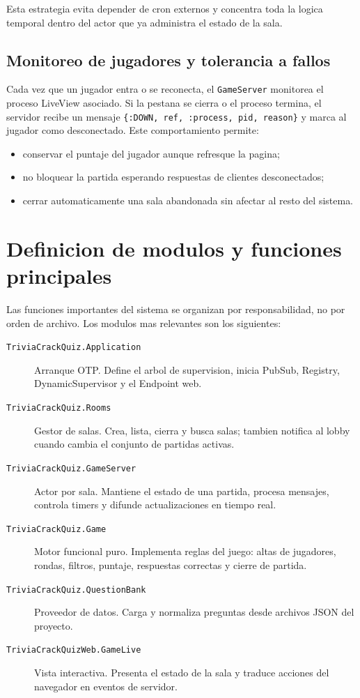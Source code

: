 \documentclass[12pt,a4paper]{article}
\begin{document}
Esta estrategia evita depender de cron externos y concentra toda la logica
temporal dentro del actor que ya administra el estado de la sala.

\subsection{Monitoreo de jugadores y tolerancia a fallos}

Cada vez que un jugador entra o se reconecta, el \texttt{GameServer} monitorea
el proceso LiveView asociado. Si la pestana se cierra o el proceso termina, el
servidor recibe un mensaje \texttt{\{:DOWN, ref, :process, pid, reason\}} y
marca al jugador como desconectado. Este comportamiento permite:

\begin{itemize}
  \item conservar el puntaje del jugador aunque refresque la pagina;
  \item no bloquear la partida esperando respuestas de clientes desconectados;
  \item cerrar automaticamente una sala abandonada sin afectar al resto del
  sistema.
\end{itemize}

\section{Definicion de modulos y funciones principales}

Las funciones importantes del sistema se organizan por responsabilidad, no por
orden de archivo. Los modulos mas relevantes son los siguientes:

\begin{description}
  \item[\texttt{TriviaCrackQuiz.Application}] Arranque OTP. Define el arbol de
  supervision, inicia PubSub, Registry, DynamicSupervisor y el Endpoint web.
  \item[\texttt{TriviaCrackQuiz.Rooms}] Gestor de salas. Crea, lista, cierra y
  busca salas; tambien notifica al lobby cuando cambia el conjunto de partidas
  activas.
  \item[\texttt{TriviaCrackQuiz.GameServer}] Actor por sala. Mantiene el estado
  de una partida, procesa mensajes, controla timers y difunde actualizaciones
  en tiempo real.
  \item[\texttt{TriviaCrackQuiz.Game}] Motor funcional puro. Implementa reglas
  del juego: altas de jugadores, rondas, filtros, puntaje, respuestas
  correctas y cierre de partida.
  \item[\texttt{TriviaCrackQuiz.QuestionBank}] Proveedor de datos. Carga y
  normaliza preguntas desde archivos JSON del proyecto.
  \item[\texttt{TriviaCrackQuizWeb.GameLive}] Vista interactiva. Presenta el
  estado de la sala y traduce acciones del navegador en eventos de servidor.
\end{description}
\end{document}
